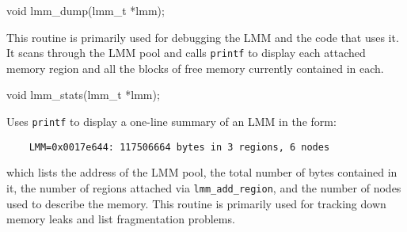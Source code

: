 \begin{apisyn}

	\funcproto void lmm_dump(lmm_t *lmm);
\end{apisyn}
\begin{apidesc}
	This routine is primarily used for debugging the LMM
	and the code that uses it.
	It scans through the LMM pool
	and calls {\tt printf} to display each attached memory region
	and all the blocks of free memory currently contained in each.
\end{apidesc}

\begin{apisyn}

	\funcproto void lmm_stats(lmm_t *lmm);
\end{apisyn}
\begin{apidesc}
	Uses {\tt printf} to display a one-line summary of an LMM
	in the form:

	\begin{codefrag}
	\begin{verbatim}
	LMM=0x0017e644: 117506664 bytes in 3 regions, 6 nodes
	\end{verbatim}
	\end{codefrag}

	which lists the address of the LMM pool, the total number of
	bytes contained in it, the number of regions attached via
	{\tt lmm_add_region}, and the number of nodes used to
	describe the memory.
	This routine is primarily used for tracking down memory leaks
	and list fragmentation problems.
\end{apidesc}
